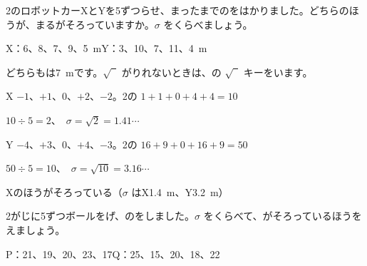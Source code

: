 \begin{reidai}
2のロボットカーXとYを5ずつらせ、まったまでのをはかりました。どちらのほうが、まるがそろっていますか。$\sigma$ をくらべましょう。\par
\hspace*{1\zw}X：6、8、7、9、\qty{5}{m}\qquad Y：3、10、7、11、\qty{4}{m}\par
\kangaekata どちらもは\qty{7}{m}です。$\sqrt{\phantom{2}}$ がりれないときは、の $\sqrt{\phantom{2}}$ キーをいます。\par
\shiki X\enspace {} $-1$、$+1$、0、$+2$、$-2$。2の $1+1+0+4+4=10$\par
\hspace*{2.6\zw}\phantom{X}\enspace {} $10\div5=2$、\ $\sigma=\sqrt{2}=1.41\cdots$\par
\hspace*{2.6\zw}Y\enspace {} $-4$、$+3$、0、$+4$、$-3$。2の $16+9+0+16+9=50$\par
\hspace*{2.6\zw}\phantom{Y}\enspace {} $50\div5=10$、\ $\sigma=\sqrt{10}=3.16\cdots$\par
\kotae Xのほうがそろっている（$\sigma$ はX\qty{1.4}{m}、Y\qty{3.2}{m}）
\end{reidai}

\begin{jibun}
2がじに5ずつボールをげ、のをしました。$\sigma$ をくらべて、がそろっているほうをえましょう。\par
P：21、19、20、23、17\qquad Q：25、15、20、18、22
\end{jibun}

